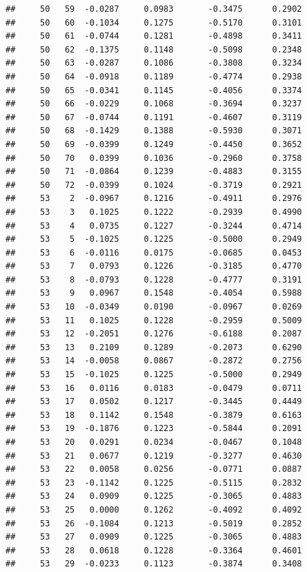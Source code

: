 \documentclass[
]{article}
\begin{document}
\begin{verbatim}
##     50   59  -0.0287     0.0983       -0.3475      0.2902 
##     50   60  -0.1034     0.1275       -0.5170      0.3101 
##     50   61  -0.0744     0.1281       -0.4898      0.3411 
##     50   62  -0.1375     0.1148       -0.5098      0.2348 
##     50   63  -0.0287     0.1086       -0.3808      0.3234 
##     50   64  -0.0918     0.1189       -0.4774      0.2938 
##     50   65  -0.0341     0.1145       -0.4056      0.3374 
##     50   66  -0.0229     0.1068       -0.3694      0.3237 
##     50   67  -0.0744     0.1191       -0.4607      0.3119 
##     50   68  -0.1429     0.1388       -0.5930      0.3071 
##     50   69  -0.0399     0.1249       -0.4450      0.3652 
##     50   70   0.0399     0.1036       -0.2960      0.3758 
##     50   71  -0.0864     0.1239       -0.4883      0.3155 
##     50   72  -0.0399     0.1024       -0.3719      0.2921 
##     53    2  -0.0967     0.1216       -0.4911      0.2976 
##     53    3   0.1025     0.1222       -0.2939      0.4990 
##     53    4   0.0735     0.1227       -0.3244      0.4714 
##     53    5  -0.1025     0.1225       -0.5000      0.2949 
##     53    6  -0.0116     0.0175       -0.0685      0.0453 
##     53    7   0.0793     0.1226       -0.3185      0.4770 
##     53    8  -0.0793     0.1228       -0.4777      0.3191 
##     53    9   0.0967     0.1548       -0.4054      0.5988 
##     53   10  -0.0349     0.0190       -0.0967      0.0269 
##     53   11   0.1025     0.1228       -0.2959      0.5009 
##     53   12  -0.2051     0.1276       -0.6188      0.2087 
##     53   13   0.2109     0.1289       -0.2073      0.6290 
##     53   14  -0.0058     0.0867       -0.2872      0.2756 
##     53   15  -0.1025     0.1225       -0.5000      0.2949 
##     53   16   0.0116     0.0183       -0.0479      0.0711 
##     53   17   0.0502     0.1217       -0.3445      0.4449 
##     53   18   0.1142     0.1548       -0.3879      0.6163 
##     53   19  -0.1876     0.1223       -0.5844      0.2091 
##     53   20   0.0291     0.0234       -0.0467      0.1048 
##     53   21   0.0677     0.1219       -0.3277      0.4630 
##     53   22   0.0058     0.0256       -0.0771      0.0887 
##     53   23  -0.1142     0.1225       -0.5115      0.2832 
##     53   24   0.0909     0.1225       -0.3065      0.4883 
##     53   25   0.0000     0.1262       -0.4092      0.4092 
##     53   26  -0.1084     0.1213       -0.5019      0.2852 
##     53   27   0.0909     0.1225       -0.3065      0.4883 
##     53   28   0.0618     0.1228       -0.3364      0.4601 
##     53   29  -0.0233     0.1123       -0.3874      0.3408 

\end{verbatim}
\end{document}
